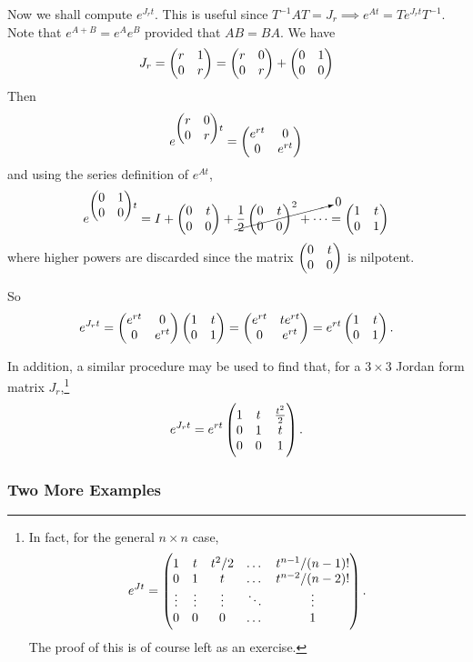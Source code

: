 Now we shall compute $e^{J_rt}$. This is useful since $T^{-1}AT = J_r \implies e^{At} = Te^{J_rt}T^{-1}$. Note that $e^{A+B} = e^A e^B$ provided that $AB = BA$. We have
\[
J_r = \begin{pmatrix}r & 1 \\ 0 & r\end{pmatrix} = \begin{pmatrix}r & 0 \\ 0 & r\end{pmatrix} + \begin{pmatrix}0 & 1 \\ 0 & 0\end{pmatrix}
\]
Then
\[
e^{\begin{pmatrix}r & 0 \\ 0 & r\end{pmatrix}t} = \begin{pmatrix}e^{rt} & 0 \\ 0 & e^{rt}\end{pmatrix}
\]
and using the series definition of $e^{At}$,
\[
e^{\begin{pmatrix}0 & 1 \\ 0 & 0\end{pmatrix}t} = I + \begin{pmatrix}0 & t \\ 0 & 0\end{pmatrix} + \cancelto{0}{\frac12\begin{pmatrix}0 & t \\ 0 & 0\end{pmatrix}^2 + \cdots} = \begin{pmatrix}1 & t \\ 0 & 1\end{pmatrix}
\]
where higher powers are discarded since the matrix $\begin{pmatrix}0 & t \\ 0 & 0\end{pmatrix}$ is nilpotent.

So
\[
e^{J_rt} = \begin{pmatrix}e^{rt} & 0 \\ 0 & e^{rt}\end{pmatrix} \begin{pmatrix}1 & t \\ 0 & 1\end{pmatrix} = \begin{pmatrix}e^{rt} & te^{rt} \\ 0 & e^{rt}\end{pmatrix} = e^{rt} \begin{pmatrix}1 & t \\ 0 & 1\end{pmatrix}.
\]

In addition, a similar procedure may be used to find that, for a $3 \times 3$ Jordan form matrix $J_r$,\footnote{In fact, for the general $n \times n$ case, \[e^{Jt} = \begin{pmatrix}1 & t & t^2/2 & \dots & t^{n-1}/(n-1)! \\ 0 & 1 & t & \dots & t^{n-2}/(n-2)! \\ \vdots & \vdots & \vdots & \ddots & \vdots \\ 0 & 0 & 0 & \dots & 1\end{pmatrix}.\] The proof of this is of course left as an exercise.}
\[
e^{J_rt} = e^{rt} \begin{pmatrix}1 & t & \frac{t^2}{2} \\ 0 & 1 & t \\ 0 & 0 & 1\end{pmatrix}.
\]


\subsubsection{Two More Examples}

